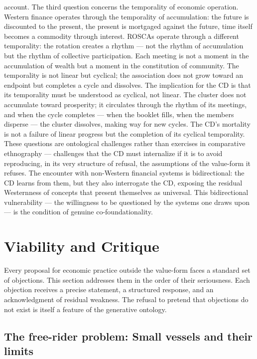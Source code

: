 account. The third question concerns the temporality of economic operation. Western finance operates through the temporality of accumulation: the future is discounted to the present, the present is mortgaged against the future, time itself becomes a commodity through interest. ROSCAs operate through a different temporality: the rotation creates a rhythm — not the rhythm of accumulation but the rhythm of collective participation. Each meeting is not a moment in the accumulation of wealth but a moment in the constitution of community. The temporality is not linear but cyclical; the association does not grow toward an endpoint but completes a cycle and dissolves. The implication for the CD is that its temporality must be understood as cyclical, not linear. The cluster does not accumulate toward prosperity; it circulates through the rhythm of its meetings, and when the cycle completes — when the booklet fills, when the members disperse — the cluster dissolves, making way for new cycles. The CD’s mortality is not a failure of linear progress but the completion of its cyclical temporality. These questions are ontological challenges rather than exercises in comparative ethnography — challenges that the CD must internalize if it is to avoid reproducing, in its very structure of refusal, the assumptions of the value-form it refuses. The encounter with non-Western financial systems is bidirectional: the CD learns from them, but they also interrogate the CD, exposing the residual Westernness of concepts that present themselves as universal. This bidirectional vulnerability — the willingness to be questioned by the systems one draws upon — is the condition of genuine co-foundationality.

\section{Viability and Critique}

Every proposal for economic practice outside the value-form faces a standard set of objections. This section addresses them in the order of their seriousness. Each objection receives a precise statement, a structured response, and an acknowledgment of residual weakness. The refusal to pretend that objections do not exist is itself a feature of the generative ontology.

\subsection{The free-rider problem: Small vessels and their limits}

